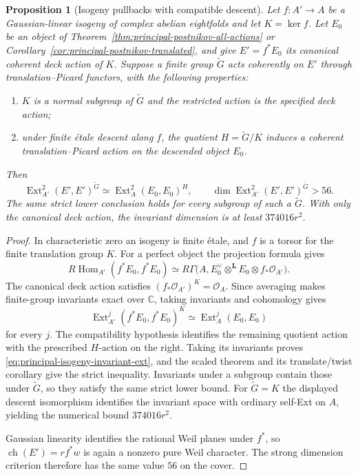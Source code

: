 \documentclass[11pt]{article}
\newtheorem{proposition}[theorem]{Proposition}
\theoremstyle{definition}
\theoremstyle{remark}
\begin{document}
\begin{proposition}[Isogeny pullbacks with compatible descent]
\label{prop:principal-postnikov-isogeny-descent}
Let $f:A'\to A$ be a Gaussian-linear isogeny of complex abelian
eightfolds and let $K=\ker f$.  Let $E_0$ be an object of
Theorem~\ref{thm:principal-postnikov-all-actions} or
Corollary~\ref{cor:principal-postnikov-translated}, and give
$E'=f^*E_0$ its canonical coherent deck action of $K$.
Suppose a finite group $\widetilde G$ acts coherently on $E'$
through translation--Picard functors, with the following
properties:
\begin{enumerate}
 \item $K$ is a normal subgroup of $\widetilde G$ and the
       restricted action is the specified deck action;
 \item under finite \'etale descent along $f$, the quotient
       $H=\widetilde G/K$ induces a coherent
       translation--Picard action on the descended object $E_0$.
\end{enumerate}
Then
\begin{equation}
 \label{eq:principal-isogeny-invariant-ext}
 \operatorname{Ext}^2_{A'}(E',E')^{\widetilde G}
    \simeq\operatorname{Ext}^2_A(E_0,E_0)^H,
 \qquad
 \dim\operatorname{Ext}^2_{A'}(E',E')^{\widetilde G}>56.
\end{equation}
The same strict lower conclusion holds for every subgroup of
such a $\widetilde G$.  With only the canonical deck action,
the invariant dimension is at least $374016r^2$.
\end{proposition}

\begin{proof}
In characteristic zero an isogeny is finite \'etale, and $f$ is
a torsor for the finite translation group $K$.
For a perfect object the projection formula gives
\[
 R\operatorname{Hom}_{A'}(f^*E_0,f^*E_0)
 \simeq R\Gamma\bigl(A,E_0^\vee\otimes^{\mathbf L}E_0
                         \otimes f_*\mathcal O_{A'}\bigr).
\]
The canonical deck action satisfies
$(f_*\mathcal O_{A'})^K=\mathcal O_A$.  Since averaging makes
finite-group invariants exact over $\mathbb C$, taking
invariants and cohomology gives
\[
 \operatorname{Ext}^j_{A'}(f^*E_0,f^*E_0)^K
       \simeq\operatorname{Ext}^j_A(E_0,E_0)
\]
for every $j$.  The compatibility hypothesis identifies the
remaining quotient action with the prescribed $H$-action on
the right.  Taking its invariants proves
\eqref{eq:principal-isogeny-invariant-ext}, and the scaled
theorem and its translate/twist corollary give the strict
inequality.  Invariants under a subgroup contain those under
$\widetilde G$, so they satisfy the same strict lower bound.
For $\widetilde G=K$ the displayed descent isomorphism identifies
the invariant space with ordinary self-Ext on $A$, yielding
the numerical bound $374016r^2$.

Gaussian linearity identifies the rational Weil planes under
$f^*$, so $\operatorname{ch}(E')=r f^*w$ is again a nonzero
pure Weil character.  The strong dimension criterion therefore
has the same value $56$ on the cover.
\end{proof}
\end{document}
